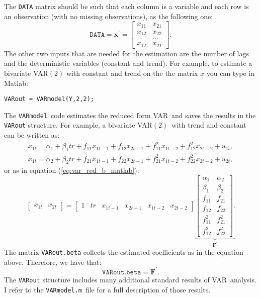 \documentclass[11pt,a4paper]{report}
\numberwithin{equation}{chapter}
\numberwithin{section}{chapter}
\begin{document}
The \texttt{DATA} matrix should be such that each column is a variable and
each row is an observation (with no missing observations), as the following
one:%
\begin{equation*}
\mathtt{DATA}=\mathbf{x}^{\prime }=\left[ 
\begin{array}{cc}
x_{11} & x_{21} \\ 
x_{12} & x_{22} \\ 
... & ... \\ 
x_{1T} & x_{2T}%
\end{array}%
\right] .
\end{equation*}%
The other two inputs that are needed for the estimation are the number of
lags and the deterministic variables (constant and trend). For example, to
estimate a bivariate VAR$(2)$ with constant and trend on the the matrix 
\textbf{$x$} you can type in Matlab:\medskip 

\texttt{VARout = VARmodel(Y,2,2);}\medskip

\noindent The \texttt{VARmodel}\ code estimates the reduced form VAR\ and
saves the results in the \texttt{VARout} structure. For example, a bivariate
VAR$(2)$\ with trend and constant can be written as:%
\begin{equation*}
\begin{array}{c}
x_{1t}=\alpha _{1}+\beta
_{1}tr+f_{11}x_{1t-1}+f_{12}x_{2t-1}+f_{11}^{2}x_{1t-2}+f_{12}^{2}x_{2t-2}+u_{1t},
\\ 
x_{1t}=\alpha _{2}+\beta
_{2}tr+f_{21}x_{1t-1}+f_{22}x_{2t-1}+f_{21}^{2}x_{1t-2}+f_{22}^{2}x_{2t-2}+u_{2t},%
\end{array}%
\end{equation*}%
or as in equation (\ref{eq:var_red_b_matlab}):%
\begin{equation*}
\left[ 
\begin{array}{cc}
x_{1t} & x_{2t}%
\end{array}%
\right] =\left[ 
\begin{array}{cccccc}
1 & tr & x_{1t-1} & x_{2t-1} & x_{1t-2} & x_{2t-2}%
\end{array}%
\right] \underset{\mathbf{F}^{\prime }}{\underbrace{\left[ 
\begin{array}{cc}
\alpha _{1} & \alpha _{2} \\ 
\beta _{1} & \beta _{2} \\ 
f_{11} & f_{21} \\ 
f_{12} & f_{22} \\ 
f_{11}^{2} & f_{21}^{2} \\ 
f_{12}^{2} & f_{22}^{2}%
\end{array}%
\right] .}}
\end{equation*}%
The matrix \texttt{VARout.beta} collects the estimated coefficients as in
the equation above. Therefore, we have that:%
\begin{equation*}
\mathtt{VARout.beta}=\mathbf{F}^{\prime }.
\end{equation*}%
The \texttt{VARout} structure includes many additional standard results of
VAR\ analysis. I refer to the \texttt{VARmodel.m}\ file for a full
description of those results.
\end{document}
